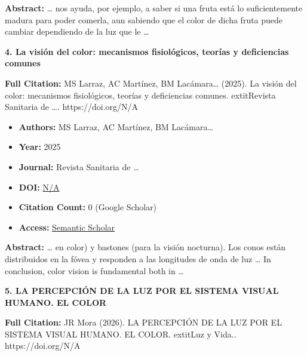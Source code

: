 \documentclass[11pt,a4paper]{article}
\begin{document}
\textbf{Abstract:} … nos ayuda, por ejemplo, a saber si una fruta está lo suficientemente madura para poder comerla, aun sabiendo que el color de dicha fruta puede cambiar dependiendo de la luz que le …\par\vspace{0.5em}



\textbf{4. La visión del color: mecanismos fisiológicos, teorías y deficiencias comunes}

\textbf{Full Citation:} MS Larraz, AC Martínez, BM Lacámara… (2025). La visión del color: mecanismos fisiológicos, teorías y deficiencias comunes. 	extit{Revista Sanitaria de …}. https://doi.org/N/A

\begin{resultbox}
\begin{itemize}[leftmargin=*]
    \item \textbf{Authors:} MS Larraz, AC Martínez, BM Lacámara…
    \item \textbf{Year:} 2025
    \item \textbf{Journal:} Revista Sanitaria de …
    
    
    
    \item \textbf{DOI:} \href{https://doi.org/}{N/A}
    \item \textbf{Citation Count:} 0 (Google Scholar)
    \item \textbf{Access:} \href{https://dialnet.unirioja.es/servlet/articulo?codigo=10349656}{Semantic Scholar}
\end{itemize}
\end{resultbox}

\textbf{Abstract:} … en color) y bastones (para la visión nocturna). Los conos están distribuidos en la fóvea y responden a las longitudes de onda de luz … In conclusion, color vision is fundamental both in …\par\vspace{0.5em}



\textbf{5. LA PERCEPCIÓN DE LA LUZ POR EL SISTEMA VISUAL HUMANO. EL COLOR}

\textbf{Full Citation:} JR Mora (2026). LA PERCEPCIÓN DE LA LUZ POR EL SISTEMA VISUAL HUMANO. EL COLOR. 	extit{Luz y Vida.}. https://doi.org/N/A
\end{document}
